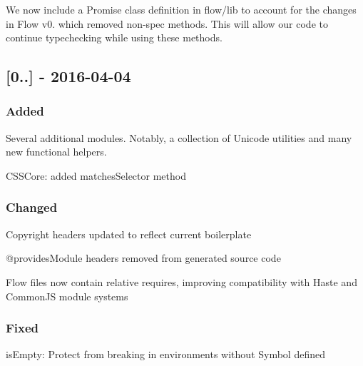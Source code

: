 \begin{DoxyItemize}
\item We now include a {\ttfamily Promise} class definition in {\ttfamily flow/lib} to account for the changes in Flow v0. which removed non-\/spec methods. This will allow our code to continue typechecking while using these methods.
\end{DoxyItemize}

\subsection*{\mbox{[}0..\mbox{]} -\/ 2016-\/04-\/04}

\subsubsection*{Added}


\begin{DoxyItemize}
\item Several additional modules. Notably, a collection of Unicode utilities and many new {\ttfamily functional} helpers.
\item {\ttfamily C\+S\+S\+Core}\+: added {\ttfamily matches\+Selector} method
\end{DoxyItemize}

\subsubsection*{Changed}


\begin{DoxyItemize}
\item Copyright headers updated to reflect current boilerplate
\item {\ttfamily @provides\+Module} headers removed from generated source code
\item Flow files now contain relative requires, improving compatibility with Haste and Common\+JS module systems
\end{DoxyItemize}

\subsubsection*{Fixed}


\begin{DoxyItemize}
\item {\ttfamily is\+Empty}\+: Protect from breaking in environments without {\ttfamily Symbol} defined
\end{DoxyItemize}

